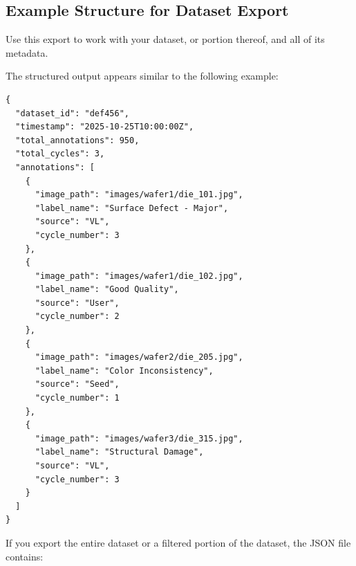 \documentclass[
  11pt,
  a4paper,
  11pt,
  oneside]{report}
\begin{document}
\subsection{Example Structure for Dataset
Export}\label{example-structure-for-dataset-export}

Use this export to work with your dataset, or portion thereof, and all
of its metadata.

The structured output appears similar to the following example:

\begin{lstlisting}
{
  "dataset_id": "def456",
  "timestamp": "2025-10-25T10:00:00Z",
  "total_annotations": 950,
  "total_cycles": 3,
  "annotations": [
    {
      "image_path": "images/wafer1/die_101.jpg",
      "label_name": "Surface Defect - Major",
      "source": "VL",
      "cycle_number": 3
    },
    {
      "image_path": "images/wafer1/die_102.jpg",
      "label_name": "Good Quality",
      "source": "User",
      "cycle_number": 2
    },
    {
      "image_path": "images/wafer2/die_205.jpg",
      "label_name": "Color Inconsistency",
      "source": "Seed",
      "cycle_number": 1
    },
    {
      "image_path": "images/wafer3/die_315.jpg",
      "label_name": "Structural Damage",
      "source": "VL",
      "cycle_number": 3
    }
  ]
}
\end{lstlisting}

If you export the entire dataset or a filtered portion of the dataset,
the JSON file contains:
\end{document}
